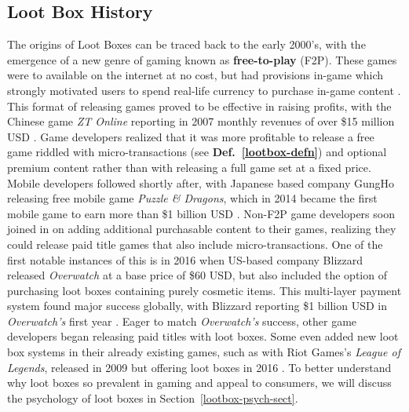 \documentclass[11pt]{article}
\newcommand\genref[2]{#1~\ref{#2}}
\newcommand\sectref[1]{\genref{Section}{#1}}
\newcommand\defnref[1]{\genref{Def.}{#1}}
\begin{document}
\subsection{Loot Box History}\label{lootbox-hist-sect}
The origins of Loot Boxes can be traced back to the early 2000's, with the emergence of a new
genre of gaming known as \textbf{free-to-play} (F2P). These games were to 
available on the internet 
at no cost, but had provisions in-game which strongly motivated users to spend
real-life currency to purchase in-game content \cite{zendle_meyer_over_2019}.
 This format of releasing games 
proved to be effective in raising profits, with the Chinese game \textit{ZT Online} reporting
in 2007 monthly revenues of over \$15 million USD \cite{koo}. Game developers 
realized that it was more profitable to release a free game riddled with micro-transactions
 (see \textbf{ \defnref{lootbox-defn}}) and optional premium content rather than 
 with releasing a full game set at a fixed price. 
Mobile developers followed shortly after, with Japanese based company 
GungHo releasing free mobile game \textit{Puzzle \& Dragons}, which in 2014 became the
 first mobile game to earn more than \$1 billion USD \cite{jordan_2014}. 
 Non-F2P game developers soon joined in on adding additional 
 purchasable content to their games, realizing they could release paid title games 
 that also include micro-transactions. 
 One of the first notable instances of this is in 2016 when US-based company 
 Blizzard released \textit{Overwatch} at a base price of \$60 USD, but also 
 included the option of purchasing loot boxes containing purely cosmetic items. 
This multi-layer payment system found major success globally,
with Blizzard reporting \$1 billion USD in \textit{Overwatch's} first year \cite{juniper2018}.
Eager to match \textit{Overwatch's} success,
 other game developers began releasing paid titles with loot boxes. Some even
 added new loot box systems in their already existing games, such as with Riot Games's 
 \textit{League of Legends}, released in 2009 but offering loot boxes in 2016 \cite{juniper2018}.
 To better understand why loot boxes so prevalent in gaming and appeal to consumers,
we will discuss the psychology of loot boxes in \sectref{lootbox-psych-sect}.
\end{document}
